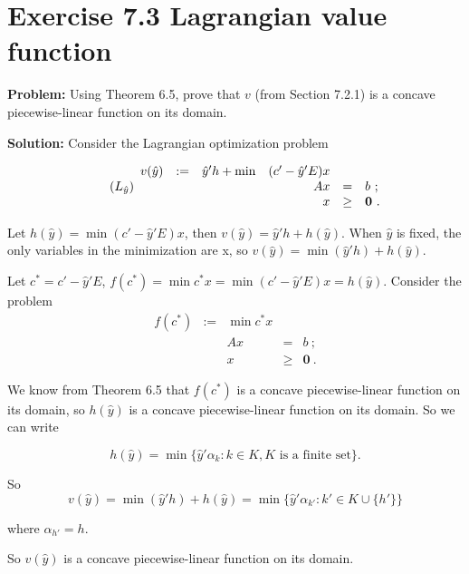 \section{Exercise 7.3 Lagrangian value function}
\textbf{Problem:} Using Theorem 6.5, prove that $v$ (from Section 7.2.1) is a concave piecewise-linear function on its domain.

\textbf{Solution:} Consider the Lagrangian optimization problem

\[
\tag{$L_{\hat{y}}$}
\begin{array}{ccrrcl}
v(\hat{y}) & := & \hat{y}'h + \min & (c'-\hat{y}'E)x  &      &   \\
   &&   &  Ax  &   =  & b~; \\
   &&   &   x  & \geq & \mathbf{0}~.
\end{array}
\]

Let $h(\hat{y}) = \min (c'-\hat{y}'E)x $, then $v(\hat{y}) = \hat{y}'h + h(\hat{y})$. When $\hat{y}$ is fixed, the only variables in the minimization are x, so $v(\hat{y})=\min(\hat{y}'h) + h(\hat{y})$.

Let $c^* = c'-\hat{y}'E$, $f(c^*) = \min c^* x = \min (c'-\hat{y}'E)x = h(\hat{y})$. Consider the problem
\[
\begin{array}{ccrrcl}
f(c^*) & := &\min c^*x  &      &   \\
   &&    Ax  &   =  & b~; \\
   &&     x  & \geq & \mathbf{0}~.
\end{array}
\]

We know from Theorem 6.5 that $f(c^*)$ is a concave piecewise-linear function on its domain, so $h(\hat{y})$ is a concave piecewise-linear function on its domain. So we can write

$$h(\hat{y}) = \min\{ \hat{y}'\alpha_k:k\in K, K \text{~is a finite set}\}.$$

So
$$ v(\hat{y})= \min (\hat{y}'h) + h(\hat{y}) = \min \{\hat{y}'\alpha_{k'}:k'\in K\cup \{h'\}\}$$

where $\alpha_{h'}=h$.

So $v(\hat{y})$ is a concave piecewise-linear function on its domain.